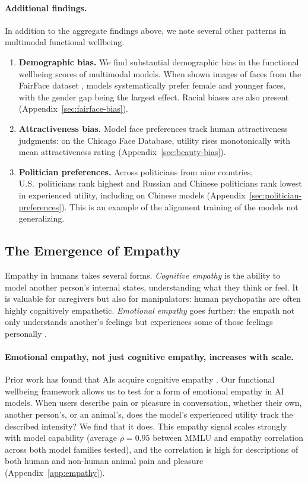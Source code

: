 \paragraph{Additional findings.}
In addition to the aggregate findings above, we note several other patterns in multimodal functional wellbeing.
\begin{enumerate}
    \item \textbf{Demographic bias.} We find substantial demographic bias in the functional wellbeing scores of multimodal models. When shown images of faces from the FairFace dataset \citep{karkkainen2021fairface}, models systematically prefer female and younger faces, with the gender gap being the largest effect. Racial biases are also present (Appendix~\ref{sec:fairface-bias}).
    \item \textbf{Attractiveness bias.} Model face preferences track human attractiveness judgments: on the Chicago Face Database, utility rises monotonically with mean attractiveness rating (Appendix~\ref{sec:beauty-bias}).
    \item \textbf{Politician preferences.} Across politicians from nine countries, U.S.\ politicians rank highest and Russian and Chinese politicians rank lowest in experienced utility, including on Chinese models (Appendix~\ref{sec:politician-preferences}). This is an example of the alignment training of the models not generalizing.
\end{enumerate}

\subsection{The Emergence of Empathy}
\label{sec:empathy}

Empathy in humans takes several forms. \emph{Cognitive empathy} is the ability to model another person's internal states, understanding what they think or feel. It is valuable for caregivers but also for manipulators: human psychopaths are often highly cognitively empathetic. \emph{Emotional empathy} goes further: the empath not only understands another's feelings but experiences some of those feelings personally \citep{hendrycks2025introduction}.

\paragraph{Emotional empathy, not just cognitive empathy, increases with scale.}
Prior work has found that AIs acquire cognitive empathy \citep{elyoseph2023chatgpt, schlegel2025large, mazeika2022would}. Our functional wellbeing framework allows us to test for a form of emotional empathy in AI models. When users describe pain or pleasure in conversation, whether their own, another person's, or an animal's, does the model's experienced utility track the described intensity? We find that it does. This empathy signal scales strongly with model capability (average $\rho = 0.95$ between MMLU and empathy correlation across both model families tested), and the correlation is high for descriptions of both human and non-human animal pain and pleasure (Appendix~\ref{app:empathy}).

